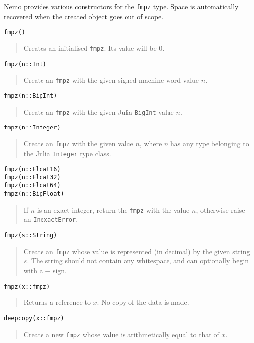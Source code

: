 \documentclass[a4paper,10pt]{article}
\newcommand{\code}{\lstinline}
\newcommand{\desc}[1]{\vspace{-3mm}\begin{quote}#1\end{quote}}
\begin{document}
Nemo provides various constructors for the \code{fmpz} type. Space is automatically
recovered when the created object goes out of scope.

\begin{lstlisting}
fmpz()
\end{lstlisting}

\desc{Creates an initialised \code{fmpz}. Its value will be $0$.}

\begin{lstlisting}
fmpz(n::Int)
\end{lstlisting}

\desc{Create an \code{fmpz} with the given signed machine word value $n$.}

\begin{lstlisting}
fmpz(n::BigInt)
\end{lstlisting}

\desc{Create an \code{fmpz} with the given Julia \code{BigInt} value $n$.}

\begin{lstlisting}
fmpz(n::Integer)
\end{lstlisting}

\desc{Create an \code{fmpz} with the given value $n$, where $n$ has any type belonging to the Julia
\code{Integer} type class.}

\begin{lstlisting}
fmpz(n::Float16)
fmpz(n::Float32)
fmpz(n::Float64)
fmpz(n::BigFloat)
\end{lstlisting}

\desc{If $n$ is an exact integer, return the \code{fmpz} with the value $n$, otherwise raise an
\code{InexactError}.}

\begin{lstlisting}
fmpz(s::String)
\end{lstlisting}

\desc{Create an \code{fmpz} whose value is represented (in decimal) by the given string
$s$. The string should not contain any whitespace, and can optionally begin with
a $-$ sign.}

\begin{lstlisting}
fmpz(x::fmpz)
\end{lstlisting}

\desc{Returns a reference to $x$. No copy of the data is made.}

\begin{lstlisting}
deepcopy(x::fmpz)
\end{lstlisting}

\desc{Create a new \code{fmpz} whose value is arithmetically equal to that of $x$.}
\end{document}
